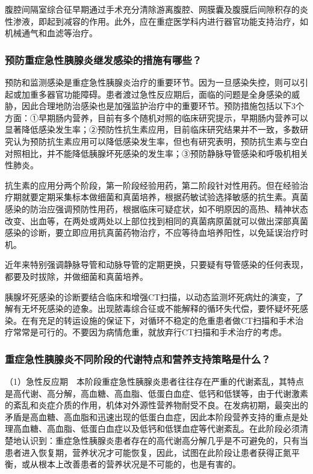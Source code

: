 腹腔间隔室综合征早期通过手术充分清除游离腹腔、网膜囊及腹膜后间隙积存的炎性渗液，即起到减容的作用。此外，应在重症医学科内进行器官功能支持治疗，如机械通气和血滤等治疗。

\subsubsection{预防重症急性胰腺炎继发感染的措施有哪些？}

预防和监测感染是重症急性胰腺炎治疗的重要环节。因为一旦感染失控，则可以引起或加重多器官功能障碍。患者渡过急性反应期后，面临的问题是全身感染的威胁，因此合理地防治感染也是加强监护治疗中的重要环节。预防措施包括以下3个方面：①早期肠内营养，目前有多个随机对照的临床研究提示，早期肠内营养可以显著降低感染发生率；②预防性抗生素应用，目前临床研究结果并不一致，多数研究认为预防抗生素应用可以降低感染发生率，但也有研究表明，预防抗生素与空白对照相比，并不能降低胰腺坏死感染的发生率；③预防静脉导管感染和呼吸机相关性肺炎。

抗生素的应用分两个阶段，第一阶段经验用药，第二阶段针对性用药。但在经验治疗期就要定期采集标本做细菌和真菌培养，根据药敏试验选择敏感的抗生素。真菌感染的防治应强调预防性用药，根据临床可疑症状，如不明原因的高热、精神状态改变、出血等，在两处或两处以上部位找到相同的真菌病原菌就可以做出深部真菌感染的诊断，要立即应用抗真菌药物治疗，不应等待血培养阳性，以免延误治疗时机。

近年来特别强调静脉导管和动脉导管的定期更换，只要疑有导管感染的任何表现，都要及时拔除，并做细菌和真菌培养。

胰腺坏死感染的诊断要结合临床和增强CT扫描，以动态监测坏死病灶的演变，了解有无坏死感染的迹象。出现脓毒综合征或不能解释的循环失代偿，要怀疑坏死感染。在有充足的转运设施的保证下，对循环不稳定的危重患者做CT扫描和手术治疗常常是可行的。不要因为病情危重，就放弃行CT扫描和手术治疗的考虑。

\subsubsection{重症急性胰腺炎不同阶段的代谢特点和营养支持策略是什么？}

（1）急性反应期　本阶段重症急性胰腺炎患者往往存在严重的代谢紊乱，其特点是高代谢、高分解，高血糖、高血脂、低蛋白血症、低钙和低镁等，由于代谢激素的紊乱和炎症介质的作用，机体对外源性营养物耐受不良。在发病初期，最突出的矛盾是高血糖、高血脂和迅速出现的低蛋白血症，因此本阶段营养支持的重点是处理高血糖、高血脂、低蛋白血症以及低钙和低镁血症等代谢紊乱。在此阶段必须清楚地认识到：重症急性胰腺炎患者存在的高代谢高分解几乎是不可避免的，只有当患者进入恢复期，营养状况才可能恢复，因此，试图在此阶段让患者获得正氮平衡，或从根本上改善患者的营养状况是不可能的，也是有害的。

